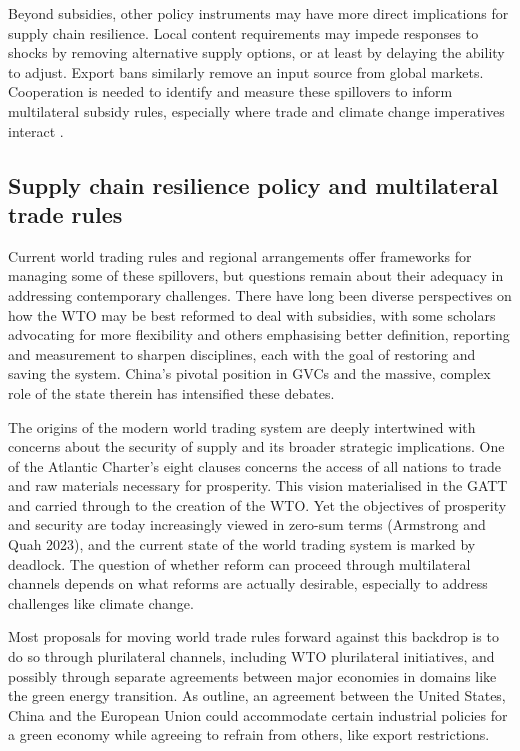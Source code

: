 \documentclass{article}
\begin{document}
Beyond subsidies, other policy instruments may have more direct implications for supply chain resilience. Local content requirements may impede responses to shocks by removing alternative supply options, or at least by delaying the ability to adjust. Export bans similarly remove an input source from global markets. Cooperation is needed to identify and measure these spillovers to inform multilateral subsidy rules, especially where trade and climate change imperatives interact \parencite{bown_modern_2024}.

\subsection{Supply chain resilience policy and multilateral trade rules}

Current world trading rules and regional arrangements offer frameworks for managing some of these spillovers, but questions remain about their adequacy in addressing contemporary challenges. There have long been diverse perspectives on how the WTO may be best reformed to deal with subsidies, with some scholars advocating for more flexibility and others emphasising better definition, reporting and measurement to sharpen disciplines, each with the goal of restoring and saving the system. China's pivotal position in GVCs and the massive, complex role of the state therein has intensified these debates.

The origins of the modern world trading system are deeply intertwined with concerns about the security of supply and its broader strategic implications. One of the Atlantic Charter's eight clauses concerns the access of all nations to trade and raw materials necessary for prosperity. This vision materialised in the GATT and carried through to the creation of the WTO. Yet the objectives of prosperity and security are today increasingly viewed in zero-sum terms (Armstrong and Quah 2023), and the current state of the world trading system is marked by deadlock. The question of whether reform can proceed through multilateral channels depends on what reforms are actually desirable, especially to address challenges like climate change.

Most proposals for moving world trade rules forward against this backdrop is to do so through plurilateral channels, including WTO plurilateral initiatives, and possibly through separate agreements between major economies in domains like the green energy transition. As \textcite{bown_how_2023} outline, an agreement between the United States, China and the European Union could accommodate certain industrial policies for a green economy while agreeing to refrain from others, like export restrictions.
\end{document}
